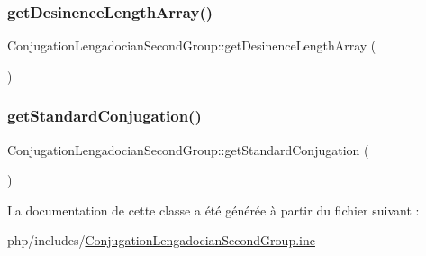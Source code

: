 \subsubsection{\texorpdfstring{get\+Desinence\+Length\+Array()}{getDesinenceLengthArray()}}
{\footnotesize\ttfamily Conjugation\+Lengadocian\+Second\+Group\+::get\+Desinence\+Length\+Array (\begin{DoxyParamCaption}{ }\end{DoxyParamCaption})\hspace{0.3cm}{\ttfamily [protected]}}

\hypertarget{class_conjugation_lengadocian_second_group_a710cb66b717733d6d5198e23a261bdab}{}\label{class_conjugation_lengadocian_second_group_a710cb66b717733d6d5198e23a261bdab} 
\subsubsection{\texorpdfstring{get\+Standard\+Conjugation()}{getStandardConjugation()}}
{\footnotesize\ttfamily Conjugation\+Lengadocian\+Second\+Group\+::get\+Standard\+Conjugation (\begin{DoxyParamCaption}{ }\end{DoxyParamCaption})\hspace{0.3cm}{\ttfamily [protected]}}



La documentation de cette classe a été générée à partir du fichier suivant \+:\begin{DoxyCompactItemize}
\item 
php/includes/\hyperlink{_conjugation_lengadocian_second_group_8inc}{Conjugation\+Lengadocian\+Second\+Group.\+inc}\end{DoxyCompactItemize}
